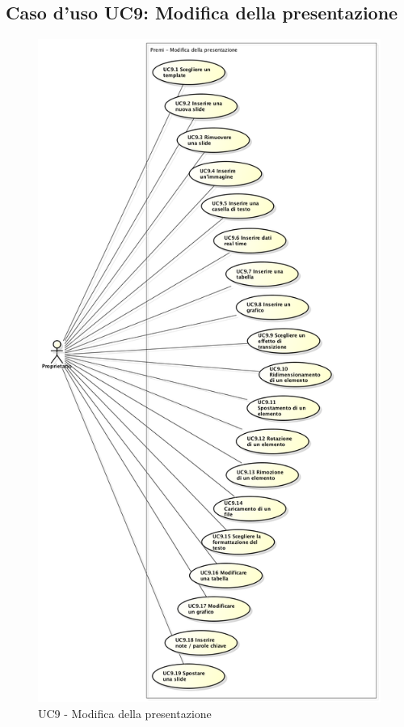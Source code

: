 \subsection{Caso d'uso UC9: Modifica della presentazione}
\begin{figure}[h] 
	\centering 
	\includegraphics[scale=0.3] {img/UC9.png}
	\caption{UC9 - Modifica della presentazione} 
\end{figure}

